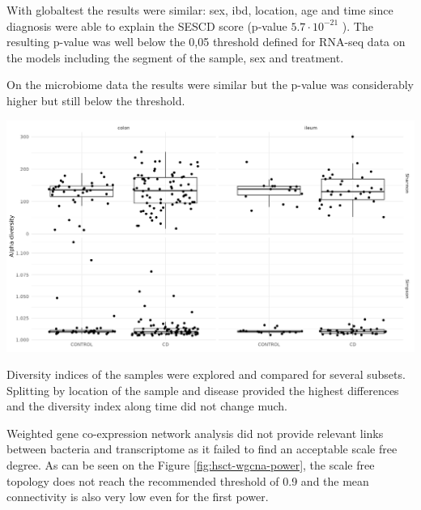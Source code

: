 \documentclass[
  a4paper,
]{book}
\let\origfigure\figure
\let\endorigfigure\endfigure
\renewenvironment{figure}[1][2] {
    \expandafter\origfigure\expandafter[!ht]
} {
    \endorigfigure
}
\begin{document}
With globaltest the results were similar: sex, ibd, location, age and time since diagnosis were able to explain the SESCD score (p-value \(5.7 \cdot 10^{-21}\) ).
The resulting p-value was well below the 0,05 threshold defined for RNA-seq data on the models including the segment of the sample, sex and treatment.

On the microbiome data the results were similar but the p-value was considerably higher but still below the threshold.

\begin{figure}
\includegraphics[width=1\linewidth]{images/hsct-ASV-diversity} \caption[Microbiome diversity on HSCT dataset.]{Microbiome diversity on HSCT dataset. On the upper section the Shannon effective and on the lower row the Simpson effective diversity splitted by colon and ileum and controls and CD.}\label{fig:hsct-diversity}
\end{figure}

Diversity indices of the samples were explored and compared for several subsets.
Splitting by location of the sample and disease provided the highest differences and the diversity index along time did not change much.

Weighted gene co-expression network analysis did not provide relevant links between bacteria and transcriptome as it failed to find an acceptable scale free degree.
As can be seen on the Figure \ref{fig:hsct-wgcna-power}, the scale free topology does not reach the recommended threshold of 0.9 and the mean connectivity is also very low even for the first power.
\end{document}

